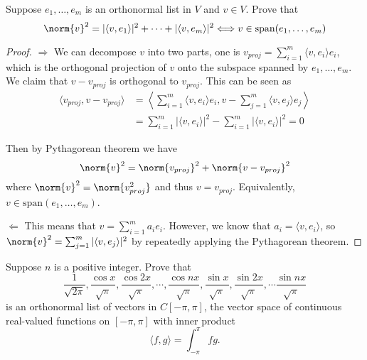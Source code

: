 \documentclass{extarticle}
\begin{document}
\begin{problem}{3}
    Suppose \(e_1, \ldots, e_m\) is an orthonormal list in \(V\) and \(v \in V\). Prove that 
    \[\norm{v}^2 = |\langle v,e_1 \rangle|^2 + \cdots + |\langle v,e_m \rangle|^2 
    \Longleftrightarrow v \in \text{span}(e_1, \ldots, e_m)\]
\end{problem}

\begin{proof}
\(\Rightarrow\) We can decompose \(v\) into two parts, one is \(v_{proj} = \sum_{i=1}^{m} 
\langle v,e_i \rangle e_i\), which is the orthogonal projection of \(v\) onto the subspace 
spanned by \(e_1, \ldots, e_m\). We claim that \(v - v_{proj}\) is orthogonal to \(v_{proj}\). 
This can be seen as 
\begin{align*}
    \langle v_{proj}, v - v_{proj} \rangle 
    &= \left\langle \sum_{i=1}^{m} \langle v,e_i \rangle e_i, v - \sum_{j=1}^{m} \langle v,e_j \rangle e_j \right\rangle \\ 
    &= \sum_{i=1}^{m} |\langle v,e_i \rangle|^2 - \sum_{i=1}^{m} |\langle v,e_i \rangle|^2 = 0 
\end{align*}

Then by Pythagorean theorem we have 
\[\norm{v}^2 = \norm{v_{proj}}^2 + \norm{v - v_{proj}}^2 \] 
where \(\norm{v}^2 = \norm{v_{proj}^2}\) and thus \(v = v_{proj}\). Equivalently, \(v \in \text{span} 
(e_1, \ldots, e_m)\).

\(\Leftarrow\) This means that \(v = \sum_{i=1}^{m} a_i e_i\). However, we know that 
\(a_i = \langle v,e_i \rangle\), so \(\norm{v}^2 = \sum_{j=1}^{m} |\langle v,e_j \rangle|^2\) by 
repeatedly applying the Pythagorean theorem. 
\end{proof}

\begin{problem}{4}
    Suppose \(n\) is a positive integer. Prove that 
    \[\frac{1}{\sqrt{2\pi}}, \frac{\cos x}{\sqrt{\pi}}, \frac{\cos 2x}{\sqrt{\pi}}, 
    \cdots, \frac{\cos n x}{\sqrt{\pi}}, \frac{\sin x}{\sqrt{\pi}}, \frac{\sin 2x}{\sqrt{\pi}}, \cdots 
    \frac{\sin n x}{\sqrt{\pi}}\]
    is an orthonormal list of vectors in \(C[-\pi, \pi]\), the vector space of continuous real-valued functions on 
    \([-\pi, \pi]\) with inner product 
    \[\langle f,g \rangle = \int_{-\pi}^{\pi} fg.\]
\end{problem}
\end{document}
